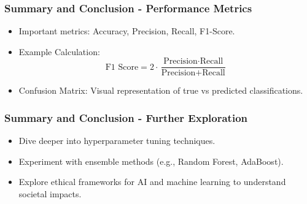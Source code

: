 \documentclass{beamer}
\begin{document}
\begin{frame}[fragile]
    \frametitle{Summary and Conclusion - Performance Metrics}
    \begin{itemize}
        \item Important metrics: Accuracy, Precision, Recall, F1-Score.
        \item Example Calculation:
        \begin{equation}
            \text{F1 Score} = 2 \cdot \frac{\text{Precision} \cdot \text{Recall}}{\text{Precision} + \text{Recall}}
        \end{equation}
        \item Confusion Matrix: Visual representation of true vs predicted classifications.
    \end{itemize}
\end{frame}

\begin{frame}[fragile]
    \frametitle{Summary and Conclusion - Further Exploration}
    \begin{itemize}
        \item Dive deeper into hyperparameter tuning techniques.
        \item Experiment with ensemble methods (e.g., Random Forest, AdaBoost).
        \item Explore ethical frameworks for AI and machine learning to understand societal impacts.
    \end{itemize}
\end{frame}
\end{document}
